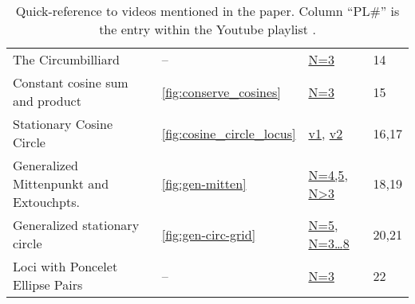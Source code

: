 \begin{table}[H]
\begin{tabular}{llll}
{The Circumbilliard} &
-- &
\href{https://youtu.be/vSCnorIJ2X8}{N=3} &
{14} \\

{Constant cosine sum and product} &
\ref{fig:conserve_cosines} &
\href{https://youtu.be/P8ykpE_ZbZ8}{N=3} &
{15} \\

{Stationary Cosine Circle} &
\ref{fig:cosine_circle_locus} &
\href{https://youtu.be/CrOSI8d8qDc}{v1},{ }
\href{https://youtu.be/hCQIT6_XhaQ}{v2} & 
{16,17} \\

{Generalized Mittenpunkt and Extouchpts.} &
\ref{fig:gen-mitten} &
\href{https://youtu.be/Bpc-MrR2IMc}{N=4,5},{ }
\href{https://youtu.be/TV2p7fPlYfE}{N>3} &
{18,19} \\

{Generalized stationary circle} &
\ref{fig:gen-circ-grid} &
\href{https://youtu.be/dINE4aH1cvk}{N=5},{ } \href{https://youtu.be/EFeINGIDFrg}{N=3\ldots{8}} &
{20,21} \\

{Loci with Poncelet Ellipse Pairs} &
-- &
\href{https://youtu.be/B5dRXT8Xerw}{N=3} &
{22}
\end{tabular}
\caption{Quick-reference to videos mentioned in the paper. Column ``PL\#'' is the entry within the Youtube playlist \cite{dsr_math_intell_playlist}.}
\label{tab:playlist}
\end{table}
